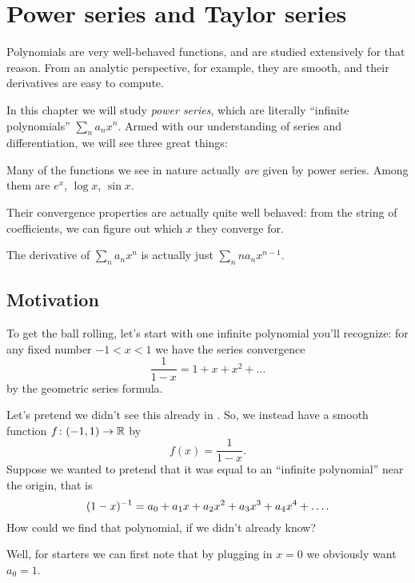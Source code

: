 \chapter{Power series and Taylor series}
Polynomials are very well-behaved functions,
and are studied extensively for that reason.
From an analytic perspective, for example, they are smooth,
and their derivatives are easy to compute.

In this chapter we will study \emph{power series},
which are literally ``infinite polynomials'' $\sum_n a_n x^n$.
Armed with our understanding of series and differentiation,
we will see three great things:
\begin{itemize}
	\ii Many of the functions we see in nature
	actually \emph{are} given by power series.
	Among them are $e^x$, $\log x$, $\sin x$.

	\ii Their convergence properties are actually quite well behaved:
	from the string of coefficients,
	we can figure out which $x$ they converge for.

	\ii The derivative of $\sum_n a_n x^n$
	is actually just $\sum_n n a_n x^{n-1}$.
\end{itemize}

\section{Motivation}
To get the ball rolling, let's start with
one infinite polynomial you'll recognize:
for any fixed number $-1 < x < 1$ we have the series convergence
\[ \frac{1}{1-x} = 1 + x + x^2 + \dots \]
by the geometric series formula.

Let's pretend we didn't see this already in
.
So, we instead have a smooth function $f \colon (-1,1) \to \mathbb R$ by
\[ f(x) = \frac{1}{1-x}. \]
Suppose we wanted to pretend that it was equal to
an ``infinite polynomial'' near the origin, that is
\[ (1-x)^{-1} = a_0 + a_1 x + a_2 x^2 + a_3 x^3 + a_4 x^4 + \dots. \]
How could we find that polynomial,
if we didn't already know?

Well, for starters we can first note that by plugging in $x = 0$
we obviously want $a_0 =1$.

